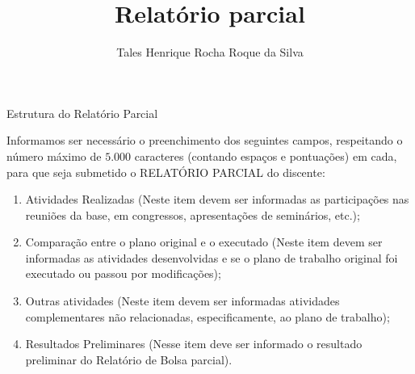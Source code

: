 \documentclass[a4paper,12pt]{article}
\title{Relatório parcial}
\author{Tales Henrique Rocha Roque da Silva}
\begin{document}
\maketitle

Estrutura do Relatório Parcial

Informamos ser necessário o preenchimento dos seguintes campos, respeitando o número máximo de $5.000$ caracteres (contando espaços e pontuações) em cada, para que seja submetido o RELATÓRIO PARCIAL do discente:

  \begin{enumerate}[1)]
    \item Atividades Realizadas (Neste item devem ser informadas as participações nas reuniões da base, em congressos, apresentações de seminários, etc.);
    \item Comparação entre o plano original e o executado (Neste item devem ser informadas as atividades desenvolvidas e se o plano de trabalho original foi executado ou passou por modificações);
    \item Outras atividades (Neste item devem ser informadas atividades complementares não relacionadas, especificamente, ao plano de trabalho);
    \item Resultados Preliminares (Nesse item deve ser informado o resultado preliminar do Relatório de Bolsa parcial).
  \end{enumerate}
\end{document}
